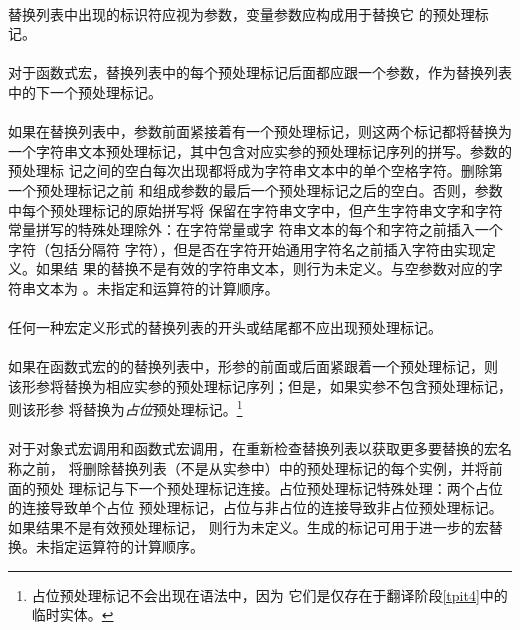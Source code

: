 \paragraph{}
替换列表中出现的标识符应视为参数，变量参数应构成用于替换它
的预处理标记。

\constraint
\paragraph{}
对于函数式宏，替换列表中的每个预处理标记\tm{\#}后面都应跟一个参数，作为替换列表
中的下一个预处理标记。

\semantic
\paragraph{}
如果在替换列表中，参数前面紧接着有一个\tm{\#}预处理标记，则这两个标记都将替换为
一个字符串文本预处理标记，其中包含对应实参的预处理标记序列的拼写。参数的预处理标
记之间的空白每次出现都将成为字符串文本中的单个空格字符。删除第一个预处理标记之前
和组成参数的最后一个预处理标记之后的空白。否则，参数中每个预处理标记的原始拼写将
保留在字符串文字中，但产生字符串文字和字符常量拼写的特殊处理除外：在字符常量或字
符串文本的每个\tm{\dq}和\tm{\bs}字符之前插入一个\tm{\bs}字符（包括分隔符\tm{\dq}
字符），但是否在\tm{\bs}字符开始通用字符名之前插入\tm{\bs}字符由实现定义。如果结
果的替换不是有效的字符串文本，则行为未定义。与空参数对应的字符串文本为
\tm{\dq\dq}。未指定\tm{\#}和\tm{\#\#}运算符的计算顺序。

\constraint
\paragraph{}
任何一种宏定义形式的替换列表的开头或结尾都不应出现\tm{\#\#}预处理标记。

\semantic
\paragraph{}
如果在函数式宏的的替换列表中，形参的前面或后面紧跟着一个\tm{\#\#}预处理标记，则
该形参将替换为相应实参的预处理标记序列；但是，如果实参不包含预处理标记，则该形参
将替换为\textit{占位}预处理标记。\footnote{占位预处理标记不会出现在语法中，因为
它们是仅存在于翻译阶段\ref{tpit4}中的临时实体。}

\paragraph{}
对于对象式宏调用和函数式宏调用，在重新检查替换列表以获取更多要替换的宏名称之前，
将删除替换列表（不是从实参中）中的\tm{\#\#}预处理标记的每个实例，并将前面的预处
理标记与下一个预处理标记连接。占位预处理标记特殊处理：两个占位的连接导致单个占位
预处理标记，占位与非占位的连接导致非占位预处理标记。如果结果不是有效预处理标记，
则行为未定义。生成的标记可用于进一步的宏替换。未指定运算符的计算顺序。

